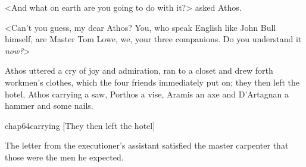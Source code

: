 <And what on earth are you going to do with it?> asked Athos.

<Can't you guess, my dear Athos? You, who speak English like John Bull himself, are Master Tom Lowe, we, your three companions. Do you understand it \textit{now?}>

Athos uttered a cry of joy and admiration, ran to a closet and drew forth workmen's clothes, which the four friends immediately put on; they then left the hotel, Athos carrying a saw, Porthos a vise, Aramis an axe and D'Artagnan a hammer and some nails.

\begin{bwbigpic}
	[\basicscale] 
	{chap64carrying}
	[They then left the hotel]
\end{bwbigpic}

The letter from the executioner's assistant satisfied the master carpenter that those were the men he expected. 